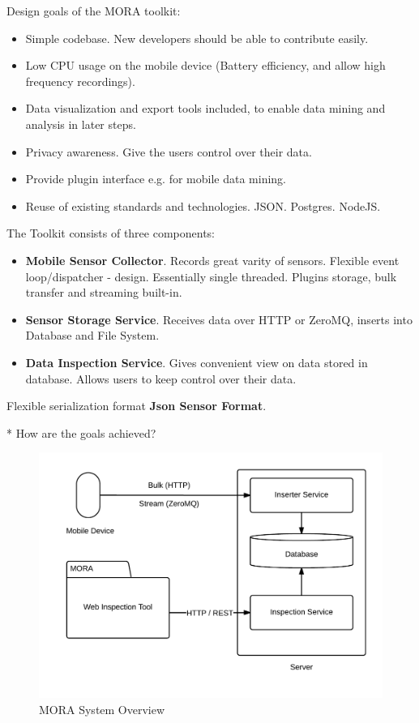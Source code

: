 \documentclass[times, 10pt,twocolumn]{article}
\begin{document}
Design goals of the MORA toolkit:
\begin{itemize}
\item Simple codebase. New developers should be able to contribute easily.
\item Low CPU usage on the mobile device (Battery efficiency, and allow high frequency recordings).
\item Data visualization and export tools included, to enable data mining and analysis in later steps.
\item Privacy awareness. Give the users control over their data.
\item Provide plugin interface e.g. for mobile data mining.
\item Reuse of existing standards and technologies. JSON. Postgres. NodeJS.
\end{itemize}

The Toolkit consists of three components:
\begin{itemize}
\item \textbf{Mobile Sensor Collector}.  Records great varity of
  sensors. Flexible event loop/dispatcher - design. Essentially single
  threaded. Plugins storage, bulk transfer and streaming built-in.
\item \textbf{Sensor Storage Service}.
  Receives data over HTTP or ZeroMQ, inserts into Database and File System.
\item \textbf{Data Inspection Service}.  Gives convenient view on data
  stored in database. Allows users to keep control over their data.
\end{itemize}

Flexible serialization format {\bf Json Sensor Format}.


* How are the goals achieved?

\begin{figure}[h]
\includegraphics[width=\linewidth]{img/system_overview.png}
\caption{MORA System Overview}
\label{overview}
\end{figure}
\end{document}
